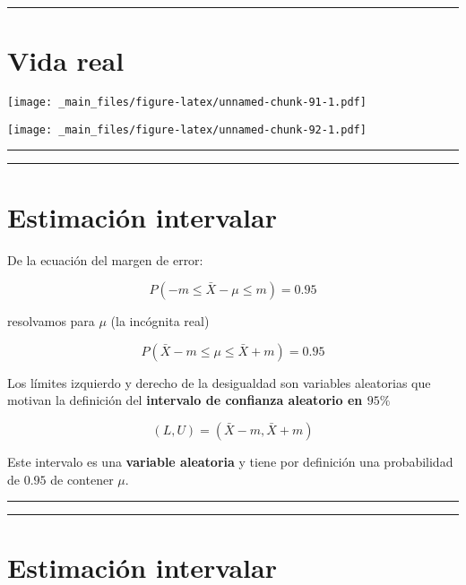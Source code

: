 \documentclass[
]{book}
\begin{document}
\begin{center}\rule{0.5\linewidth}{0.5pt}\end{center}

\hypertarget{vida-real}{%
\section{Vida real}\label{vida-real}}

\texttt{[image: \_main\_files/figure-latex/unnamed-chunk-91-1.pdf]}

\texttt{[image: \_main\_files/figure-latex/unnamed-chunk-92-1.pdf]}

\begin{center}\rule{0.5\linewidth}{0.5pt}\end{center}

\begin{center}\rule{0.5\linewidth}{0.5pt}\end{center}

\hypertarget{estimaciuxf3n-intervalar-1}{%
\section{Estimación intervalar}\label{estimaciuxf3n-intervalar-1}}

De la ecuación del margen de error:

\[P(-m \leq \bar{X} - \mu \leq m)=0.95\]

resolvamos para \(\mu\) (la incógnita real)

\[P(\bar{X} - m \leq \mu \leq \bar{X} + m)=0.95\]

Los límites izquierdo y derecho de la desigualdad son variables aleatorias que motivan la definición del \textbf{intervalo de confianza aleatorio en \(95\%\)}

\[(L,U)=(\bar{X} - m,\bar{X} + m)\]

Este intervalo es una \textbf{variable aleatoria} y tiene por definición una probabilidad de \(0.95\) de contener \(\mu\).

\begin{center}\rule{0.5\linewidth}{0.5pt}\end{center}

\begin{center}\rule{0.5\linewidth}{0.5pt}\end{center}

\hypertarget{estimaciuxf3n-intervalar-2}{%
\section{Estimación intervalar}\label{estimaciuxf3n-intervalar-2}}
\end{document}
